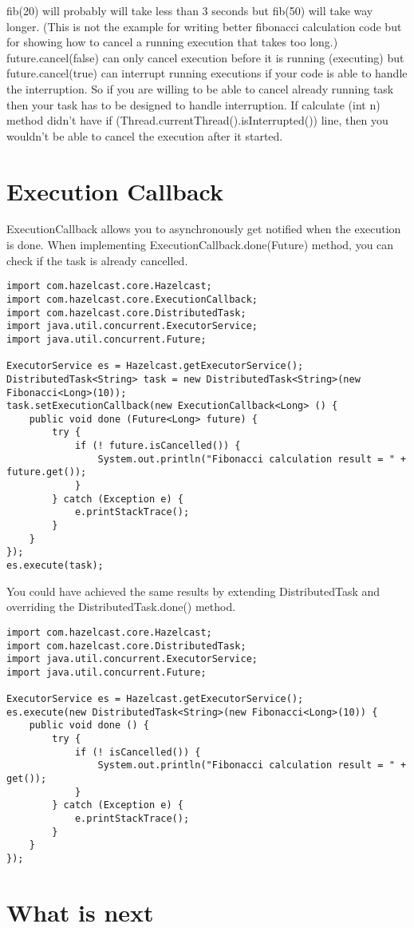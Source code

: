 fib(20) will probably will take less than 3 seconds but fib(50) will take way longer. (This is not the example for writing better fibonacci calculation code but for showing how to cancel a running execution that takes too long.) future.cancel(false) can only cancel execution before it is running (executing) but future.cancel(true) can interrupt running executions if your code is able to handle the interruption. So if you are willing to be able to cancel already running task then your task has to be designed to handle interruption. If calculate (int n) method didn't have if (Thread.currentThread().isInterrupted()) line, then you wouldn't be able to cancel the execution after it started.

\section{Execution Callback}

ExecutionCallback allows you to asynchronously get notified when the execution is done. When implementing ExecutionCallback.done(Future) method, you can check if the task is already cancelled.

\begin{verbatim}
import com.hazelcast.core.Hazelcast;
import com.hazelcast.core.ExecutionCallback;
import com.hazelcast.core.DistributedTask;
import java.util.concurrent.ExecutorService;    
import java.util.concurrent.Future; 
        
ExecutorService es = Hazelcast.getExecutorService();
DistributedTask<String> task = new DistributedTask<String>(new Fibonacci<Long>(10));
task.setExecutionCallback(new ExecutionCallback<Long> () {
    public void done (Future<Long> future) { 
        try {
            if (! future.isCancelled()) {
                System.out.println("Fibonacci calculation result = " + future.get());
            }
        } catch (Exception e) {
            e.printStackTrace();
        }
    }
});
es.execute(task);
\end{verbatim}

You could have achieved the same results by extending DistributedTask and overriding the DistributedTask.done() method.

\begin{verbatim}
import com.hazelcast.core.Hazelcast;
import com.hazelcast.core.DistributedTask;
import java.util.concurrent.ExecutorService;    
import java.util.concurrent.Future; 
        
ExecutorService es = Hazelcast.getExecutorService();
es.execute(new DistributedTask<String>(new Fibonacci<Long>(10)) {
    public void done () { 
        try {
            if (! isCancelled()) {
                System.out.println("Fibonacci calculation result = " + get());
            }
        } catch (Exception e) {
            e.printStackTrace();
        }
    }
}); 
\end{verbatim}

\section{What is next}
